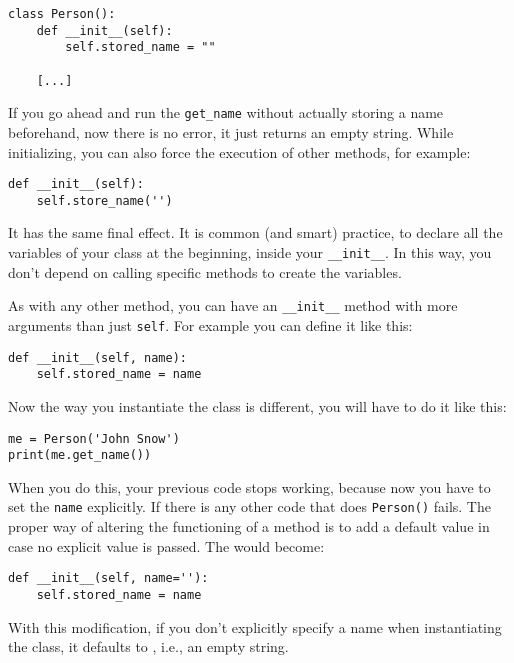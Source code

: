 \begin{verbatim}
class Person():
    def __init__(self):
        self.stored_name = ""

    [...]
\end{verbatim}

If you go ahead and run the \texttt{get_name} without actually storing a name beforehand, now there is no error, it just returns an empty string. While initializing, you can also force the execution of other methods, for example:

\begin{verbatim}
def __init__(self):
    self.store_name('')
\end{verbatim}

It has the same final effect. It is common (and smart) practice, to declare all the variables of your class at the beginning, inside your \texttt{__init__}. In this way, you don't depend on calling specific methods to create the variables.

As with any other method, you can have an \texttt{__init__} method with more arguments than just \texttt{self}. For example you can define it like this:

\begin{verbatim}
def __init__(self, name):
    self.stored_name = name
\end{verbatim}

Now the way you instantiate the class is different, you will have to do it like this:

\begin{verbatim}
me = Person('John Snow')
print(me.get_name())
\end{verbatim}

When you do this, your previous code stops working, because now you have to set the \texttt{name} explicitly. If there is any other code that does \texttt{Person()} fails. The proper way of altering the functioning of a method is to add a default value in case no explicit value is passed. The  would become:

\begin{verbatim}
def __init__(self, name=''):
    self.stored_name = name
\end{verbatim}

With this modification, if you don't explicitly specify a name when instantiating the class, it defaults to , i.e., an empty string.


